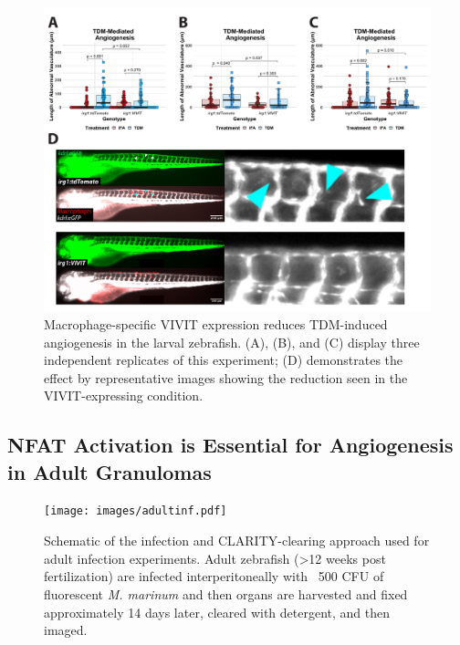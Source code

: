 \begin{figure}
\centering
\includegraphics[width=\textwidth]{images/vivittdm.pdf}
\caption{Macrophage-specific VIVIT expression reduces TDM-induced angiogenesis in the larval zebrafish. (A), (B), and (C) display three independent replicates of this experiment; (D) demonstrates the effect by representative images showing the reduction seen in the VIVIT-expressing condition.}
\label{figure:vivittdm}
\end{figure}

\subsection{NFAT Activation is Essential for Angiogenesis in Adult Granulomas}\label{nfatc2aAdult}

\begin{figure}
\centering
\texttt{[image: images/adultinf.pdf]}
\caption{Schematic of the infection and CLARITY-clearing approach used for adult infection experiments. Adult zebrafish (>12 weeks post fertilization) are infected interperitoneally with ~500 CFU of fluorescent \textit{M. marinum} and then organs are harvested and fixed approximately 14 days later, cleared with detergent, and then imaged.}
\label{figure:adult}
\end{figure}

